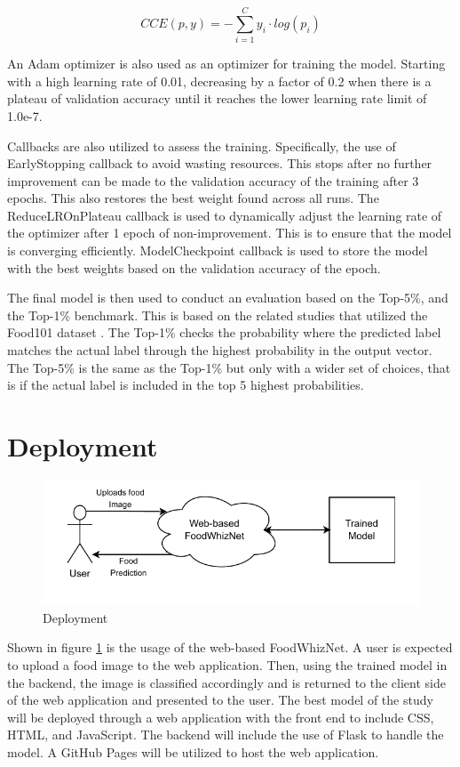 \begin{equation} \label{eq:cce}
CCE(p,y)= -\sum_{i=1}^{C} y_i\cdot log(p_i)
\end{equation}

An Adam optimizer is also used as an optimizer for training the model. Starting with a high learning rate of 0.01, decreasing by a factor of 0.2 when there is a plateau of validation accuracy until it reaches the lower learning rate limit of 1.0e-7. 

Callbacks are also utilized to assess the training. Specifically, the use of EarlyStopping callback to avoid wasting resources. This stops after no further improvement can be made to the validation accuracy of the training after 3 epochs. This also restores the best weight found across all runs. The ReduceLROnPlateau callback is used to dynamically adjust the learning rate of the optimizer after 1 epoch of non-improvement. This is to ensure that the model is converging efficiently. ModelCheckpoint callback is used to store the model with the best weights based on the validation accuracy of the epoch.

The final model is then used to conduct an evaluation based on the Top-5\%, and the Top-1\% benchmark. This is based on the related studies that utilized the Food101 dataset \cite{pandey-2017,vijayakumari-2022,martinel-2018}. The Top-1\% checks the probability where the predicted label matches the actual label through the highest probability in the output vector. The Top-5\% is the same as the Top-1\% but only with a wider set of choices, that is if the actual label is included in the top 5 highest probabilities.
\section{Deployment}
\begin{figure}[h]
	\centering
	\includegraphics[width=1\textwidth]{graphics/images/deployment.pdf}
	\caption{Deployment}
	\label{fig:deploy}
\end{figure}
Shown in figure \ref{fig:deploy} is the usage of the web-based FoodWhizNet. A user is expected to upload a food image to the web application. Then, using the trained model in the backend, the image is classified accordingly and is returned to the client side of the web application and presented to the user. The best model of the study will be deployed through a web application with the front end to include CSS, HTML, and JavaScript. The backend will include the use of Flask to handle the model. A GitHub Pages will be utilized to host the web application.